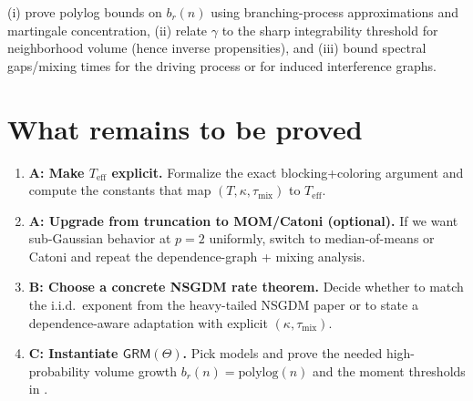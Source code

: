 \documentclass[11pt]{article}
\newcommand{\1}{\mathbf{1}}
\newcommand{\polylog}{\mathrm{polylog}}
\theoremstyle{plain}
\theoremstyle{definition}
\theoremstyle{remark}
\begin{document}
(i) prove polylog bounds on $b_r(n)$ using branching-process approximations and martingale concentration,
(ii) relate $\gamma$ to the sharp integrability threshold for neighborhood volume (hence inverse propensities),
and (iii) bound spectral gaps/mixing times for the driving process or for induced interference graphs.

\section{What remains to be proved}
\label{sec:todo}

\begin{enumerate}[leftmargin=2em]
\item \textbf{A: Make $T_{\mathrm{eff}}$ explicit.} Formalize the exact blocking+coloring argument
and compute the constants that map $(T,\kappa,\tau_{\mathrm{mix}})$ to $T_{\mathrm{eff}}$.
\item \textbf{A: Upgrade from truncation to MOM/Catoni (optional).} If we want sub-Gaussian behavior at $p=2$ uniformly,
switch to median-of-means or Catoni and repeat the dependence-graph + mixing analysis.
\item \textbf{B: Choose a concrete NSGDM rate theorem.} Decide whether to match the i.i.d.\ exponent from the heavy-tailed NSGDM paper
or to state a dependence-aware adaptation with explicit $(\kappa,\tau_{\mathrm{mix}})$.
\item \textbf{C: Instantiate $\mathsf{GRM}(\Theta)$.} Pick models and prove the needed high-probability volume growth $b_r(n)=\polylog(n)$ and the moment thresholds in .
\end{enumerate}






\end{document}
